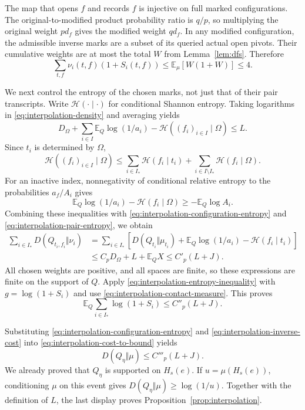 \documentclass[11pt]{article}
\theoremstyle{definition}
\begin{document}
The map that opens $f$ and records $f$ is injective on full marked
configurations. The original-to-modified product probability ratio is
$q/p$, so multiplying the original weight $pd_f$ gives the modified
weight $qd_f$. In any modified configuration, the admissible inverse
marks are a subset of its queried actual open pivots. Their cumulative
weights are at most the total $W$ from Lemma~\ref{lem:dfs}. Therefore
\begin{equation}\label{eq:interpolation-contact-measure}
 \sum_{t,f}\nu_i(t,f)(1+S_i(t,f))
 \le\mathbb E_\mu[W(1+W)]\le4.
\end{equation}

We next control the entropy of the chosen marks, not just that of their
pair transcripts. Write $\mathcal H(\cdot\mid\cdot)$ for conditional
Shannon entropy. Taking logarithms in
\eqref{eq:interpolation-density} and averaging yields
\begin{equation}\label{eq:interpolation-joint-contact-cost}
 D_\Omega+\sum_{i\in I}\mathbb E_Q\log(1/a_i)
       -\mathcal H((f_i)_{i\in I}\mid\Omega)\le L.
\end{equation}
Since $t_i$ is determined by $\Omega$,
\[
 \mathcal H((f_i)_{i\in I}\mid\Omega)
 \le\sum_{i\in I_*}\mathcal H(f_i\mid t_i)
    +\sum_{i\in I\setminus I_*}\mathcal H(f_i\mid\Omega).
\]
For an inactive index, nonnegativity of conditional relative entropy
to the probabilities $a_f/A_i$ gives
\[
 \mathbb E_Q\log(1/a_i)-\mathcal H(f_i\mid\Omega)
 \ge-\mathbb E_Q\log A_i.
\]
Combining these inequalities with
\eqref{eq:interpolation-configuration-entropy} and
\eqref{eq:interpolation-pair-entropy}, we obtain
\begin{align*}
 \sum_{i\in I_*}D(Q_{t_i,f_i}\Vert\nu_i)
 &=\sum_{i\in I_*}\left[
 D(Q_{t_i}\Vert\mu_{t_i})+
 \mathbb E_Q\log(1/a_i)-\mathcal H(f_i\mid t_i)\right]\\
 &\le C_pD_\Omega+L+\mathbb E_Q X
 \le C'_p(L+J).
\end{align*}
All chosen weights are positive, and all spaces are finite, so these
expressions are finite on the support of $Q$.
Apply \eqref{eq:interpolation-entropy-inequality} with
$g=\log(1+S_i)$ and use
\eqref{eq:interpolation-contact-measure}. This proves
\begin{equation}\label{eq:interpolation-inverse-cost}
 \mathbb E_Q\sum_{i\in I_*}\log(1+S_i)\le C''_p(L+J).
\end{equation}

Substituting \eqref{eq:interpolation-configuration-entropy} and
\eqref{eq:interpolation-inverse-cost} into
\eqref{eq:interpolation-cost-to-bound} yields
\begin{equation}\label{eq:interpolation-output-entropy}
 D(Q_\eta\Vert\mu)\le C'''_p(L+J).
\end{equation}
We already proved that $Q_\eta$ is supported on $H_s(e)$. If
$u=\mu(H_s(e))$, conditioning $\mu$ on this event gives
$D(Q_\eta\Vert\mu)\ge\log(1/u)$.
Together with the definition of $L$, the last display proves
Proposition~\ref{prop:interpolation}.
\end{document}
